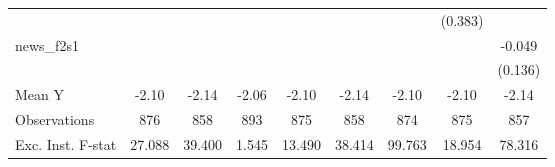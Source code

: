{\begin{tabular}{l*{8}{c}}
            &                     &                     &                     &                     &                     &                     &     (0.383)         &                     \\
\addlinespace
news\_f2s1   &                     &                     &                     &                     &                     &                     &                     &      -0.049         \\
            &                     &                     &                     &                     &                     &                     &                     &     (0.136)         \\
\midrule
Mean Y      &       -2.10         &       -2.14         &       -2.06         &       -2.10         &       -2.14         &       -2.10         &       -2.10         &       -2.14         \\
Observations&         876         &         858         &         893         &         875         &         858         &         874         &         875         &         857         \\
Exc. Inst. F-stat&      27.088         &      39.400         &       1.545         &      13.490         &      38.414         &      99.763         &      18.954         &      78.316         \\
\bottomrule
\end{tabular}
}
